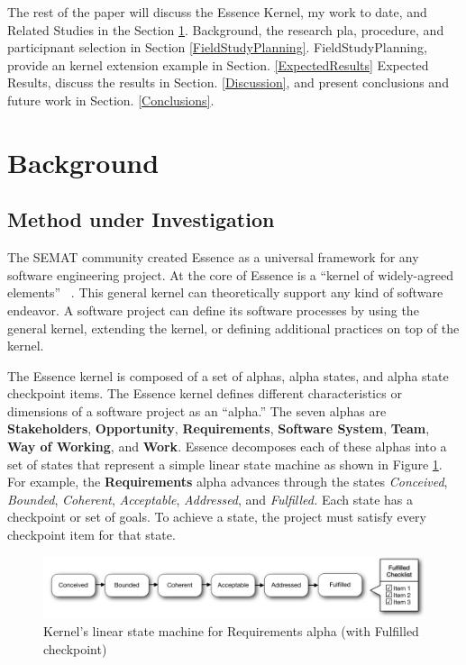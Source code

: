 \documentclass[preprint,12pt,3p]{elsarticle}
\begin{document}
The rest of the paper will discuss the Essence Kernel, my work to date, and Related Studies in the Section \ref{Background}. Background, the research pla, procedure, and participnant selection in Section \ref{FieldStudyPlanning}. FieldStudyPlanning, provide an kernel extension example in Section. \ref{ExpectedResults} Expected Results, discuss the results in Section. \ref{Discussion}, and present conclusions and future work in Section. \ref{Conclusions}.

\section{Background}
\label{Background}

\subsection{Method under Investigation}
The SEMAT community created Essence as a universal framework for any software engineering project. At the core of Essence is a ``kernel of widely-agreed elements'' ~\cite{JacobsonQueue}. This general kernel can theoretically support any kind of software endeavor. A software project can define its software processes by using the general kernel, extending the kernel, or defining additional practices on top of the kernel.

The Essence kernel is composed of a set of alphas, alpha states, and alpha state checkpoint items. The Essence kernel defines different characteristics or dimensions of a software project as an ``alpha.'' The seven alphas are \textbf{Stakeholders}, \textbf{Opportunity}, \textbf{Requirements}, \textbf{Software System}, \textbf{Team}, \textbf{Way of Working}, and \textbf{Work}. Essence decomposes each of these alphas into a set of states that represent a simple linear state machine as shown in Figure \ref{StateMachine}. For example, the \textbf{Requirements} alpha advances through the states \textit{Conceived}, \textit{Bounded}, \textit{Coherent}, \textit{Acceptable}, \textit{Addressed}, and \textit{Fulfilled.} Each state has a checkpoint or set of goals. To achieve a state, the project must satisfy every checkpoint item for that state. \cite{OMGStandard} 
 
\begin{figure}[h]\vspace*{4pt}
\centerline{\includegraphics[width=5.4in]{kernel_images/StateMachineRequirements}}
\caption{Kernel's linear state machine for Requirements alpha (with Fulfilled checkpoint)}\vspace*{-6pt}\label{StateMachine}
\end{figure}
\end{document}
